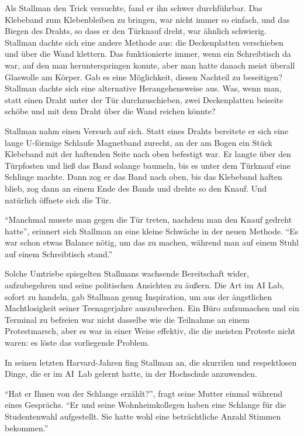 Als Stallman den Trick versuchte, fand er ihn schwer durchführbar. Das Klebeband zum Klebenbleiben zu bringen, war nicht immer so einfach, und das Biegen des Drahts, so dass er den Türknauf dreht, war ähnlich schwierig. Stallman dachte sich eine andere Methode aus: die Deckenplatten verschieben und über die Wand klettern. Das funktionierte immer, wenn ein Schreibtisch da war, auf den man herunterspringen konnte, aber man hatte danach meist überall Glaswolle am Körper. Gab es eine Möglichkeit, diesen Nachteil zu beseitigen? Stallman dachte sich eine alternative Herangehensweise aus. Was, wenn man, statt einen Draht unter der Tür durchzuschieben, zwei Deckenplatten beiseite schöbe und mit dem Draht über die Wand reichen könnte?

Stallman nahm einen Versuch auf sich. Statt eines Drahts bereitete er sich eine lange U-förmige Schlaufe Magnetband zurecht, an der am Bogen ein Stück Klebeband mit der haftenden Seite nach oben befestigt war. Er langte über den Türpfosten und ließ das Band solange baumeln, bis es unter dem Türknauf eine Schlinge machte. Dann zog er das Band nach oben, bis das Klebeband haften blieb, zog dann an einem Ende des Bands und drehte so den Knauf. Und natürlich öffnete sich die Tür.

"`Manchmal musste man gegen die Tür treten, nachdem man den Knauf gedreht hatte"', erinnert sich Stallman an eine kleine Schwäche in der neuen Methode. "`Es war schon etwas Balance nötig, um das zu machen, während man auf einem Stuhl auf einem Schreibtisch stand."'

Solche Umtriebe spiegelten Stallmans wachsende Bereitschaft wider, aufzubegehren und seine politischen Ansichten zu äußern. Die Art im AI Lab, sofort zu handeln, gab Stallman genug Inspiration, um aus der ängstlichen Machtlosigkeit seiner Teenagerjahre auszubrechen. Ein Büro aufzumachen und ein Terminal zu befreien war nicht dasselbe wie die Teilnahme an einem Protestmarsch, aber es war in einer Weise effektiv, die die meisten Proteste nicht waren: es löste das vorliegende Problem.

In seinen letzten Harvard-Jahren fing Stallman an, die skurrilen und respektlosen Dinge, die er im AI~Lab gelernt hatte, in der Hochschule anzuwenden.

"`Hat er Ihnen von der Schlange erzählt?"', fragt seine Mutter einmal während eines Gesprächs. "`Er und seine Wohnheimkollegen haben eine Schlange für die Studentenwahl aufgestellt. Sie hatte wohl eine beträchtliche Anzahl Stimmen bekommen."'

